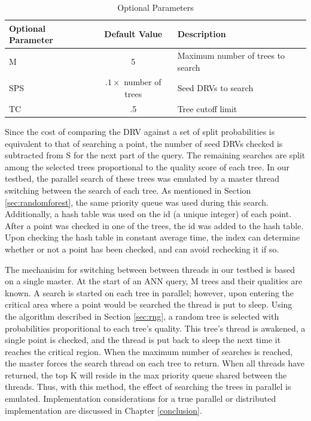 \begin{table}
\centering
\begin{tabular}{ | l | c | l |}
	\hline
	Optional Parameter & Default Value & Description \\
	\hline
	M & 5 & Maximum number of trees to search \\
	\hline
	SPS & $.1 \times$ number of trees & Seed DRVs to search \\
	\hline
	TC & .5 & Tree cutoff limit \\ 
	\hline
\end{tabular}
\caption{Optional Parameters}
\label{table:annparam}
\end{table}

Since the cost of comparing the DRV against a set of split probabilities is equivalent to that of searching a point, the number of seed DRVs checked is subtracted from S for the next part of the query.  The remaining searches are split among the selected trees proportional to the quality score of each tree.  In our testbed, the parallel search of these trees was emulated by a master thread switching between the search of each tree.  As mentioned in Section \ref{sec:randomforest}, the same priority queue was used during this search.  Additionally, a hash table was used on the id (a unique integer) of each point.  After a point was checked in one of the trees, the id was added to the hash table.  Upon checking the hash table in constant average time, the index can determine whether or not a point has been checked, and can avoid rechecking it if so.

The mechanisim for switching between between threads in our testbed is based on a single master.  At the start of an ANN query, M trees and their qualities are known.  A search is started on each tree in parallel; however, upon entering the critical area where a point would be searched the thread is put to sleep.  Using the algorithm described in Section \ref{sec:rng}, a random tree is selected with probabilities proporitional to each tree's quality.  This tree's thread is awakened, a single point is checked, and the thread is put back to sleep the next time it reaches the critical region.  When the maximum number of searches is reached, the master forces the search thread on each tree to return.  When all threads have returned, the top K will reside in the max priority queue shared between the threads.  Thus, with this method, the effect of searching the trees in parallel is emulated.  Implementation considerations for a true parallel or distributed implementation are discussed in Chapter \ref{conclusion}.

